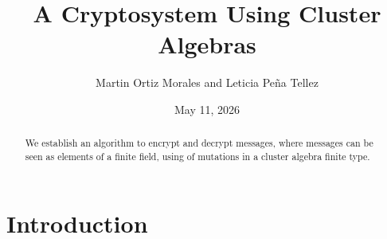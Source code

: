 \documentclass[12pt,a4paper]{article}
\begin{document}
\title{A Cryptosystem Using Cluster Algebras}

\author{ Martin Ortiz Morales and Leticia Peña Tellez}
\date{May 11, 2026}
\maketitle

\begin{abstract}
We establish an algorithm to encrypt and decrypt messages, where messages can be seen as elements of a finite field, using of mutations in a cluster algebra finite type.
\end{abstract}

\section*{Introduction}
\end{document}
